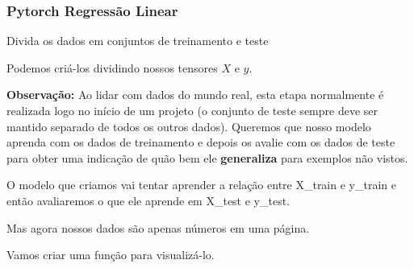 \documentclass{beamer}
\begin{document}
\begin{frame}
	\frametitle{Pytorch Regressão Linear}
	\begin{block}{Divida os dados em conjuntos de treinamento e teste}
		
		Podemos criá-los dividindo nossos tensores $X$ e $y$.
		
		\textbf{Observação:} Ao lidar com dados do mundo real, esta etapa normalmente é realizada logo no início de um projeto (o conjunto de teste sempre deve ser mantido separado de todos os outros dados). Queremos que nosso modelo aprenda com os dados de treinamento e depois os avalie com os dados de teste para obter uma indicação de quão bem ele \textbf{generaliza} para exemplos não vistos.
		
		O modelo que criamos vai tentar aprender a relação entre X\_train e y\_train e então avaliaremos o que ele aprende em X\_test e y\_test.
		
		Mas agora nossos dados são apenas números em uma página.
		
		Vamos criar uma função para visualizá-lo.
	\end{block}
\end{frame}
\end{document}
